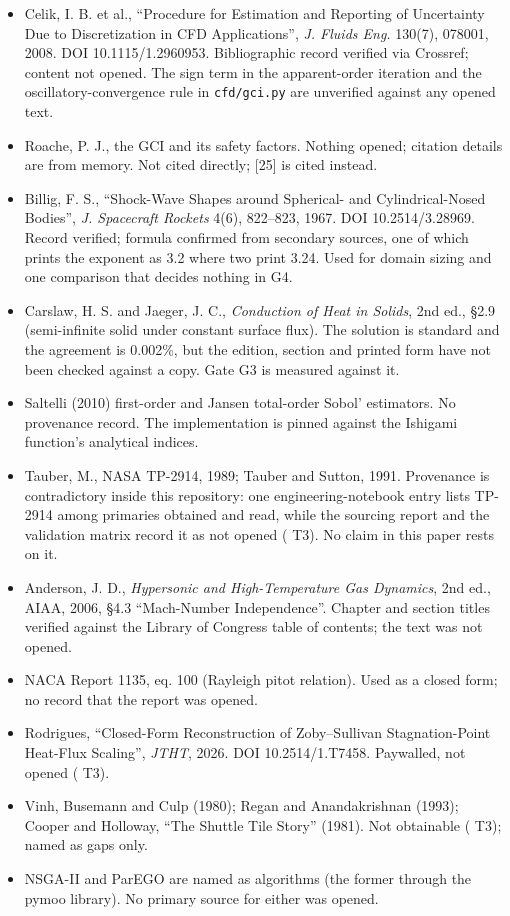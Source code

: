 \documentclass[
  a4paper,
  11pt]{article}
\providecommand{\tightlist}{%
  \setlength{\itemsep}{0pt}\setlength{\parskip}{0pt}}
\newcommand{\tierno}{{\color{crit}\ding{55}}}
\begin{document}
\begin{itemize}
\tightlist
\item
  Celik, I. B. et al., ``Procedure for Estimation and Reporting of
  Uncertainty Due to Discretization in CFD Applications'', \emph{J.
  Fluids Eng.} 130(7), 078001, 2008. DOI 10.1115/1.2960953.
  Bibliographic record verified via Crossref; content not opened. The
  sign term in the apparent-order iteration and the
  oscillatory-convergence rule in \texttt{cfd/\allowbreak{}gci.py} are
  unverified against any opened text.
\item
  Roache, P. J., the GCI and its safety factors. Nothing opened;
  citation details are from memory. Not cited directly; {[}25{]} is
  cited instead.
\item
  Billig, F. S., ``Shock-Wave Shapes around Spherical- and
  Cylindrical-Nosed Bodies'', \emph{J. Spacecraft Rockets} 4(6),
  822--823, 1967. DOI 10.2514/3.28969. Record verified; formula
  confirmed from secondary sources, one of which prints the exponent as
  3.2 where two print 3.24. Used for domain sizing and one comparison
  that decides nothing in G4.
\item
  Carslaw, H. S. and Jaeger, J. C., \emph{Conduction of Heat in Solids},
  2nd ed., §2.9 (semi-infinite solid under constant surface flux). The
  solution is standard and the agreement is 0.002\%, but the edition,
  section and printed form have not been checked against a copy. Gate G3
  is measured against it.
\item
  Saltelli (2010) first-order and Jansen total-order Sobol' estimators.
  No provenance record. The implementation is pinned against the
  Ishigami function's analytical indices.
\item
  Tauber, M., NASA TP-2914, 1989; Tauber and Sutton, 1991. Provenance is
  contradictory inside this repository: one engineering-notebook entry
  lists TP-2914 among primaries obtained and read, while the sourcing
  report and the validation matrix record it as not opened (\tierno{}
  T3). No claim in this paper rests on it.
\item
  Anderson, J. D., \emph{Hypersonic and High-Temperature Gas Dynamics},
  2nd ed., AIAA, 2006, §4.3 ``Mach-Number Independence''. Chapter and
  section titles verified against the Library of Congress table of
  contents; the text was not opened.
\item
  NACA Report 1135, eq. 100 (Rayleigh pitot relation). Used as a closed
  form; no record that the report was opened.
\item
  Rodrigues, ``Closed-Form Reconstruction of Zoby--Sullivan
  Stagnation-Point Heat-Flux Scaling'', \emph{JTHT}, 2026. DOI
  10.2514/1.T7458. Paywalled, not opened (\tierno{} T3).
\item
  Vinh, Busemann and Culp (1980); Regan and Anandakrishnan (1993);
  Cooper and Holloway, ``The Shuttle Tile Story'' (1981). Not obtainable
  (\tierno{} T3); named as gaps only.
\item
  NSGA-II and ParEGO are named as algorithms (the former through the
  pymoo library). No primary source for either was opened.
\end{itemize}
\end{document}
